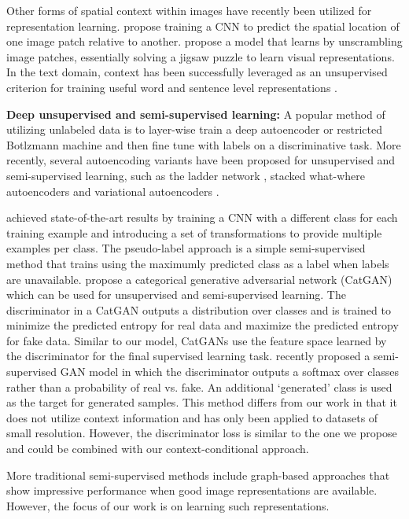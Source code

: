 \documentclass{article} \usepackage{iclr2017_conference,times}
\begin{document}
Other forms of spatial context within images have recently been
utilized for representation learning.  
\cite{doersch2015} propose training a CNN to predict the spatial
location of one image patch relative to another.  
\cite{noroozi2016} propose a model that learns by unscrambling image
patches, essentially solving a jigsaw puzzle to learn visual
representations. In the text domain, context has been successfully
leveraged as an unsupervised criterion for training useful word and
sentence level representations \citep{collobert2011, mikolov2013,
  kiros2015}.  


\textbf{Deep unsupervised and semi-supervised learning:} A popular method
of utilizing unlabeled data is to layer-wise train a deep autoencoder
or restricted Botlzmann machine \citep{hinton2006} and then fine tune
with labels on a discriminative task.  More recently, several
autoencoding variants have been proposed for unsupervised and
semi-supervised learning, such as the ladder network \citep{ramus2015},
stacked what-where autoencoders \citep{zhao2016} and variational
autoencoders \citep{kingma2014a, kingma2014b}.

\cite{dosovitskiy2014b} achieved state-of-the-art results
by training a CNN with a different class for each training example and
introducing a set of transformations to provide multiple examples per
class.  The pseudo-label approach
\citep{lee2013} is a simple semi-supervised method that trains using
the maximumly predicted class as a label when labels are unavailable.
\cite{Springenberg2015} propose a categorical generative adversarial network (CatGAN) which can be used for unsupervised and semi-supervised learning. 
The discriminator in a CatGAN outputs a distribution over classes and is trained to minimize the predicted entropy for real data and maximize the predicted entropy for fake data. 
Similar to our model, CatGANs use the feature space learned by the discriminator for the final supervised learning task. 
\cite{Salimans2016} recently proposed a semi-supervised GAN model in which the discriminator outputs a softmax over classes rather than a probability of real vs. fake. 
An additional `generated' class is used as the target for generated samples. 
This method differs from our work in that it does not utilize context information and has only been applied to datasets of small resolution. 
However, the discriminator loss is similar to the one we propose and could be combined with our context-conditional approach.

More traditional semi-supervised methods include graph-based
approaches \citep{Zhuo04,Zhu06semi-supervisedlearning} that show
impressive performance when good image representations are
available. However, the focus of our work is on learning such
representations.
\end{document}
